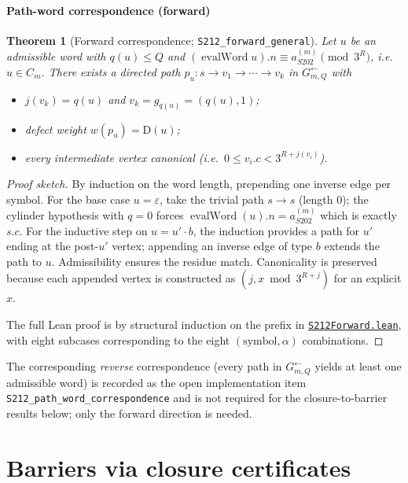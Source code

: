 \documentclass[11pt,a4paper]{article}
\theoremstyle{plain}
\newtheorem{theorem}{Theorem}[section]
\theoremstyle{definition}
\newcommand{\aSat}{a_{S202}^{(m)}}
\newcommand{\defect}{\mathrm{D}}
\newcommand{\InvG}{G^{\!\leftarrow}}
\DeclareMathOperator{\evalWord}{evalWord}
\begin{document}
\subsection{Path-word correspondence (forward)}

\begin{theorem}[Forward correspondence; \texttt{S212\_forward\_general}]
\label{thm:s212-forward}
Let $u$ be an admissible word with $q(u) \le Q$ and
$(\evalWord u).n \equiv \aSat \pmod{3^R}$, i.e.\ $u \in C_m$.
There exists a directed path
$p_u : s \to v_1 \to \cdots \to v_k$ in $\InvG_{m, Q}$ with
\begin{itemize}
  \item $j(v_k) = q(u)$ and $v_k = g_{q(u)} = (q(u), 1)$;
  \item defect weight $w(p_u) = \defect(u)$;
  \item every intermediate vertex canonical
        (i.e.\ $0 \le v_i.c < 3^{R + j(v_i)}$).
\end{itemize}
\end{theorem}

\begin{proof}[Proof sketch]
By induction on the word length, prepending one inverse edge per
symbol. For the base case $u = \varepsilon$, take the trivial path
$s \to s$ (length $0$); the cylinder hypothesis with $q = 0$ forces
$\evalWord(u).n = \aSat$ which is exactly $s.c$. For the inductive
step on $u = u' \cdot b$, the induction provides a path for $u'$
ending at the post-$u'$ vertex; appending an inverse edge of type
$b$ extends the path to $u$. Admissibility ensures the residue
match. Canonicality is preserved because each appended vertex is
constructed as $(j, x \bmod 3^{R + j})$ for an explicit $x$.

The full Lean proof is by structural induction on the prefix in
\href{run:CollatzLean4/CollatzLean4/S212Forward.lean}%
{\texttt{S212Forward.lean}}, with eight subcases corresponding to
the eight $(\text{symbol}, \alpha)$ combinations.
\end{proof}

The corresponding \emph{reverse} correspondence (every path in
$\InvG_{m, Q}$ yields at least one admissible word) is recorded as
the open implementation item \texttt{S212\_path\_word\_correspondence}
and is not required for the closure-to-barrier results below; only
the forward direction is needed.

\part{Barriers via closure certificates}\label{part:barriers}
\end{document}
